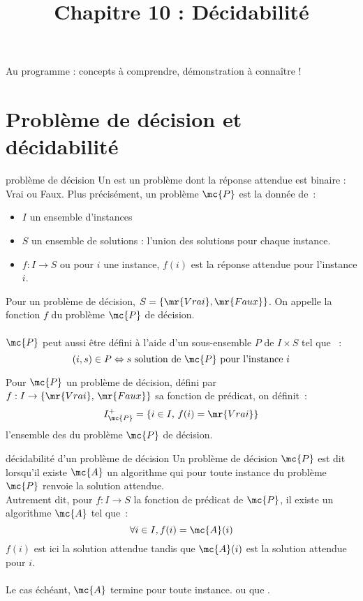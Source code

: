 

\begin{adjustwidth}{-3cm}{-3cm}

\setcounter{chapitre}{10}

\title{Chapitre 10 : Décidabilité}
\maketitle

Au programme : concepts à comprendre, démonstration à connaître !

\section{Problème de décision et décidabilité}

\begin{definition}{}{problème de décision}
    Un  est un problème dont la réponse attendue est binaire : Vrai ou Faux. Plus précisément, un problème $\mc{P}$ est la donnée de~:
    \begin{itemize}
        \item $I$ un ensemble d'instances
        \item $S$ un ensemble de solutions : l'union des solutions pour chaque instance.
        \item $f : I \to S$ ou pour $i$ une instance, $f(i)$ est la réponse attendue pour l'instance $i$.
    \end{itemize}
    Pour un problème de décision, $S = \{\mr{Vrai}, \mr{Faux}\}$. On appelle la fonction $f$  du problème $\mc{P}$ de décision.\\\\
    $\mc{P}$ peut aussi être défini à l'aide d'un sous-ensemble $P$ de $I \times S$ tel que ~:
    $$(i,s) \in P \Leftrightarrow s \text{ solution de $\mc{P}$ pour l'instance $i$}$$
\end{definition}



Pour $\mc{P}$ un problème de décision, défini par $f : I \to \{\mr{Vrai},\, \mr{Faux}\}$ sa fonction de prédicat, on définit~:
$$I_{\mc{P}}^+ = \{i \in I,\, f(i) = \mr{Vrai}\}$$
l'ensemble des  du problème $\mc{P}$ de décision.


\begin{definition}{}{décidabilité d'un problème de décision}
    Un problème de décision $\mc{P}$ est dit  lorsqu'il existe $\mc{A}$ un algorithme qui pour toute instance du problème $\mc{P}$ renvoie la solution attendue.\\
    Autrement dit, pour $f : I \to S$ la fonction de prédicat de $\mc{P}$, il existe un algorithme $\mc{A}$ tel que~:
    $$\forall i \in I, f(i) = \mc{A}(i)$$
    $f(i)$ est ici la solution attendue tandis que $\mc{A}(i)$ est la solution attendue pour $i$.\\\\
    Le cas échéant, $\mc{A}$ termine pour toute instance.
     ou que .
\end{definition}


\end{adjustwidth}
